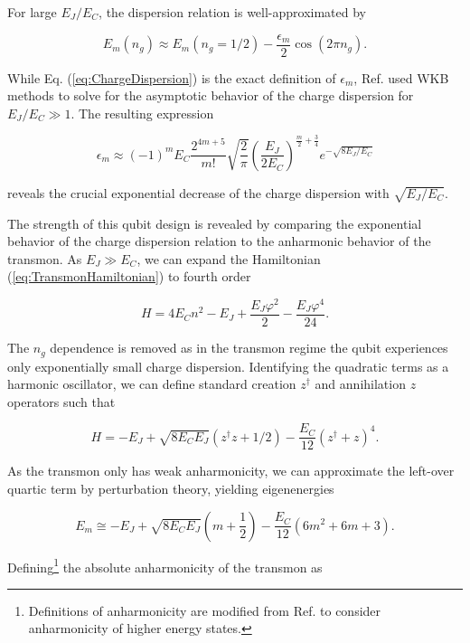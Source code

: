 \documentclass[11 pt, oneside]{book} %
\begin{document}
For large $E_J/E_C$, the dispersion relation is well-approximated by

\begin{equation}
E_m(n_g)\approx E_m(n_g=1/2)-\frac{\epsilon_m}{2}\cos(2\pi n_g).
\end{equation}

While Eq. (\ref{eq:ChargeDispersion}) is the exact definition of $\epsilon_m$, Ref. \cite{Koch} used WKB methods to solve for the asymptotic behavior of the charge dispersion for $E_J/E_C\gg 1$. The resulting expression

\begin{equation}
\epsilon_m\approx(-1)^m E_C \frac{2^{4m+5}}{m!}\sqrt{\frac{2}{\pi}}\left(\frac{E_J}{2E_C} \right)^{\frac{m}{2}+\frac{3}{4}}e^{-\sqrt{8E_J/E_C}}
\end{equation}

reveals the crucial exponential decrease of the charge dispersion with $\sqrt{E_J/E_C}$.

The strength of this qubit design is revealed by comparing the exponential behavior of the charge dispersion relation to the anharmonic behavior of the transmon. As $E_J\gg E_C$, we can expand the Hamiltonian (\ref{eq:TransmonHamiltonian}) to fourth order

\begin{equation}
H=4E_Cn^2-E_J +\frac{E_J\varphi^2}{2}-\frac{E_J\varphi^4}{24}.
\end{equation}
 
The $n_g$ dependence is removed as in the transmon regime the qubit experiences only exponentially small charge dispersion. Identifying the quadratic terms as a harmonic oscillator, we can define standard  creation $z^{\dag}$ and annihilation $z$ operators such that 

\begin{equation}
H=-E_J+\sqrt{8E_CE_J}(z^{\dag}z+1/2)-\frac{E_C}{12}(z^{\dag}+z)^4.
\end{equation}

As the transmon only has weak anharmonicity, we can approximate the left-over quartic term by perturbation theory, yielding eigenenergies

\begin{equation}\label{eq:PerturbationAnharmonicity}
E_m\cong-E_J+\sqrt{8E_CE_J}\left( m+\frac{1}{2}\right)-\frac{E_C}{12}(6m^2+6m+3).
\end{equation}

Defining\footnote{Definitions of anharmonicity are modified from Ref. \cite{Koch} to consider anharmonicity of higher energy states.} the absolute anharmonicity of the transmon as 
\end{document}
